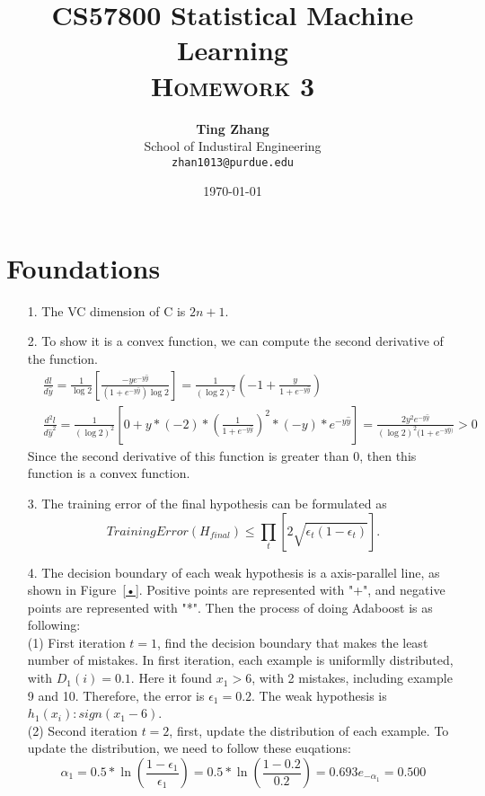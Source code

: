 \documentclass[11pt]{article}
\title{
\textbf{CS57800 Statistical Machine Learning} \\ \textsc{Homework 3} \\
\normalsize\vspace{0.1in}
}
\author{
	\textbf{Ting Zhang} \\
	School of Industiral Engineering\\
	\texttt{zhan1013@purdue.edu}
}
\date{\today}
\begin{document}
\maketitle

\section{Foundations}
\begin{itemize}
\item[1.]
The VC dimension of C is \(2n+1\).
\item[2.] To show it is a convex function, we can compute the second derivative of the function.
\begin{align*}
& \frac{dl}{d\hat{y}} = \frac{1}{\log 2}[\frac{-ye^{-y\hat{y}}}{(1+e^{-y\hat{y}}) \log 2}] = \frac{1}{(\log 2)^2} (-1 + \frac{y}{1+e^{-y\hat{y}}})  \\
& \frac{d^2l}{d\hat{y}^2} =  \frac{1}{(\log 2)^2}[0 + y*(-2)*(\frac{1}{1+e^{-y\hat{y}}})^2 * (-y) * e^{-y\hat{y}}] = \frac{2y^2e^{-y\hat{y}}}{(\log 2)^2 (1+e^{-y\hat{y})}} > 0
\end{align*}
Since the second derivative of this function is greater than 0, then this function is a convex function.
\item[3.] The training error of the final hypothesis can be formulated as
\begin{equation*}
TrainingError(H_{final}) \leq \prod_{t} [2 \sqrt{\epsilon_t(1-\epsilon_t)}].
\end{equation*}
\item[4.] The decision boundary of each weak hypothesis is a axis-parallel line, as shown in Figure~\ref{•}. Positive points are represented with "+", and negative points are represented with "*". Then the process of doing Adaboost is as following: \\
(1) First iteration \(t=1\), find the decision boundary that makes the least number of mistakes. In first iteration, each example is uniformlly distributed, with \(D_1(i)=0.1\). Here it found \(x_1>6\), with 2 mistakes, including example 9 and 10. Therefore, the error is \(\epsilon_1=0.2\). The weak hypothesis is \(h_1(x_i): sign(x_1-6)\).\\
(2) Second iteration \(t=2\), first, update the distribution of each example. To update the distribution, we need to follow these euqations:
\begin{equation*}
\alpha_1 = 0.5 * \ln (\frac{1-\epsilon_1}{\epsilon_1}) = 0.5 * \ln (\frac{1-0.2}{0.2}) = 0.693
e_{-\alpha_1} = 0.500 

\end{equation*}
\end{itemize}
\end{document}
